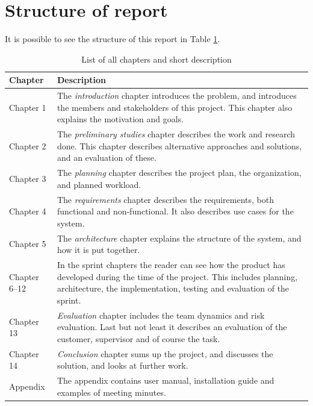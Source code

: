\section{Structure of report}
It is possible to see the structure of this report in Table \ref{tab:structure_of_report}.
\begin{table}[!ht]\centering
\caption{List of all chapters and short description}
\label{tab:structure_of_report}
\def\arraystretch{1.3}
\begin{tabularx}{\textwidth}{lX} \toprule[0.5mm]
\textbf{Chapter} & \textbf{Description} \\ \midrule
Chapter 1 & The \emph{introduction} chapter introduces the problem, and introduces the members and stakeholders of this project.
This chapter also explains the motivation and goals. \\

Chapter 2 &  The \emph{preliminary studies} chapter describes the work and research done. This chapter describes alternative approaches and solutions, and an evaluation of these. \\

Chapter 3 &  The \emph{planning} chapter describes the project plan, the organization, and planned workload.  \\

Chapter 4 &  The \emph{requirements} chapter describes the requirements, both functional and non-functional. It also describes use cases for the system. \\

Chapter 5	 &  The \emph{architecture} chapter explains the structure of the system, and how it is put together. \\

Chapter 6--12 	&  In the sprint chapters the reader can see how the product has developed during the time of the project. This includes planning, architecture, the implementation, testing and evaluation of the sprint. \\

Chapter 13 	 &  \emph{Evaluation} chapter includes the team dynamics and risk evaluation. Last but not least it describes an evaluation of the customer, supervisor and of course the task. \\

Chapter 14 	 &  \emph{Conclusion} chapter sums up the project, and discusses the solution, and looks at further work. \\

\midrule
Appendix 	 &   The appendix contains user manual, installation guide and examples of meeting minutes.\\

\bottomrule[0.5mm]
\end{tabularx}
\end{table}

